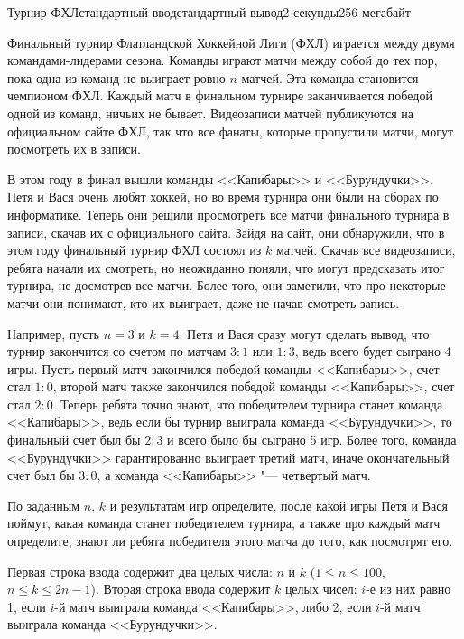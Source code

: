 \begin{problem}{Турнир ФХЛ}{стандартный ввод}{стандартный вывод}{2 секунды}{256 мегабайт}

Финальный турнир Флатландской Хоккейной Лиги (ФХЛ) играется между двумя командами-лидерами сезона.
Команды играют матчи между собой до тех пор, пока одна из команд не выиграет ровно $n$ матчей.
Эта команда становится чемпионом ФХЛ. 
Каждый матч в финальном турнире заканчивается победой одной из команд, ничьих не бывает.
Видеозаписи матчей публикуются на официальном сайте ФХЛ, так что все фанаты, которые пропустили матчи,
могут посмотреть их в записи.

В этом году в финал вышли команды <<Капибары>> и <<Бурундучки>>.
Петя и Вася очень любят хоккей, но во время турнира они были на сборах по информатике. 
Теперь они решили просмотреть все матчи финального турнира в записи, скачав их с официального сайта.
Зайдя на сайт, они обнаружили, что в этом году финальный турнир ФХЛ состоял из $k$ матчей.
Скачав все видеозаписи, ребята начали их смотреть, но неожиданно поняли, что могут предсказать
итог турнира, не досмотрев все матчи. Более того, они заметили, что про некоторые матчи
они понимают, кто их выиграет, даже не начав смотреть запись.

Например, пусть $n = 3$ и $k = 4$. Петя и Вася сразу могут сделать вывод, что турнир
закончится со счетом по матчам $3:1$ или $1:3$, ведь всего будет сыграно 4 игры. Пусть первый матч закончился
победой команды <<Капибары>>, счет стал $1:0$, второй матч также закончился победой команды <<Капибары>>, счет
стал $2:0$. Теперь ребята точно знают, что победителем турнира станет команда <<Капибары>>, ведь
если бы турнир выиграла команда <<Бурундучки>>, то финальный счет был бы $2:3$ и всего
было бы сыграно 5 игр. Более того, команда <<Бурундучки>> гарантированно выиграет третий матч,
иначе окончательный счет был бы $3:0$, а команда <<Капибары>> "--- четвертый матч.

По заданным $n$, $k$ и результатам игр определите, после какой игры Петя и Вася
поймут, какая команда станет победителем турнира, а также про каждый матч
определите, знают ли ребята победителя этого матча до того, как посмотрят его.

\InputFile
Первая строка ввода содержит два целых числа: $n$ и $k$ ($1 \le n \le 100$, $n \le k \le 2n-1$).
Вторая строка ввода содержит $k$ целых чисел: $i$-е из них равно 1, если $i$-й матч
выиграла команда <<Капибары>>, либо 2, если $i$-й матч выиграла команда <<Бурундучки>>.


\end{problem}
